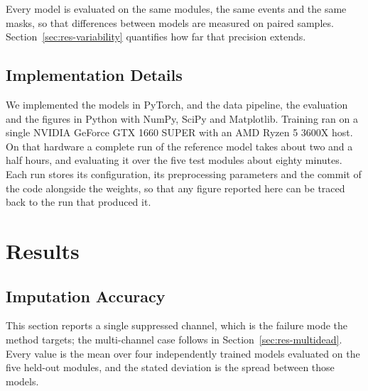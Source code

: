\documentclass[10pt,conference]{IEEEtran}
\begin{document}
Every model is evaluated on the same modules, the same events and the same
masks, so that differences between models are measured on paired samples.
Section~\ref{sec:res-variability} quantifies how far that precision extends.

\subsection{Implementation Details}
\label{sec:implementation}

We implemented the models in PyTorch, and the data pipeline, the evaluation and
the figures in Python with NumPy, SciPy and Matplotlib. Training ran on a single
NVIDIA GeForce GTX 1660 SUPER with an AMD Ryzen 5 3600X host. On that hardware a
complete run of the reference model takes about two and a half hours, and
evaluating it over the five test modules about eighty minutes. Each run stores
its configuration, its preprocessing parameters and the commit of the code
alongside the weights, so that any figure reported here can be traced back to
the run that produced it.


\section{Results}
\label{sec:results}

\subsection{Imputation Accuracy}
\label{sec:res-accuracy}

This section reports a single suppressed channel, which is the failure mode the
method targets; the multi-channel case follows in
Section~\ref{sec:res-multidead}. Every value is the mean over four
independently trained models evaluated on the five held-out modules, and the
stated deviation is the spread between those models.
\end{document}
